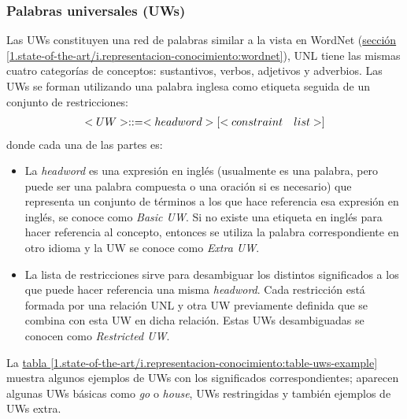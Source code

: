 \documentclass[a4paper,12pt,spanish]{book}
\begin{document}
\subsubsection{Palabras universales (UWs)}
\label{1.state-of-the-art/i.representacion-conocimiento:palabras-universales-uws}
Las UWs constituyen una red de palabras similar a la vista en WordNet (\hyperref[1.state-of-the-art/i.representacion-conocimiento:wordnet]{sección  \ref*{1.state-of-the-art/i.representacion-conocimiento:wordnet}}),
UNL tiene las mismas cuatro categorías de conceptos: sustantivos, verbos, adjetivos y adverbios.
Las UWs se forman utilizando una palabra inglesa como etiqueta seguida de un conjunto de
restricciones:
\begin{gather}
\begin{split}<UW> ::= <headword> [<constraint \quad list>]\end{split}\notag
\end{gather}
donde cada una de las partes es:
\begin{itemize}
\item {} 
La \emph{headword} es una expresión en inglés (usualmente es una palabra, pero puede ser una
palabra compuesta o una oración si es necesario) que representa un conjunto de términos
a los que hace referencia esa expresión en inglés, se conoce como \emph{Basic UW}. Si no
existe una etiqueta en inglés para hacer referencia al concepto, entonces se utiliza la
palabra correspondiente en otro idioma y la UW se conoce como \emph{Extra UW}.

\item {} 
La lista de restricciones sirve para desambiguar los distintos significados a los que puede
hacer referencia una misma \emph{headword}. Cada restricción está formada por una relación UNL
y otra UW previamente definida que se combina con esta UW en dicha relación. Estas UWs
desambiguadas se conocen como \emph{Restricted UW}.

\end{itemize}

La \hyperref[1.state-of-the-art/i.representacion-conocimiento:table-uws-example]{tabla  \ref*{1.state-of-the-art/i.representacion-conocimiento:table-uws-example}} muestra algunos ejemplos de UWs con los significados
correspondientes; aparecen algunas UWs básicas como \emph{go} o \emph{house}, UWs restringidas y
también ejemplos de UWs extra.
\end{document}
